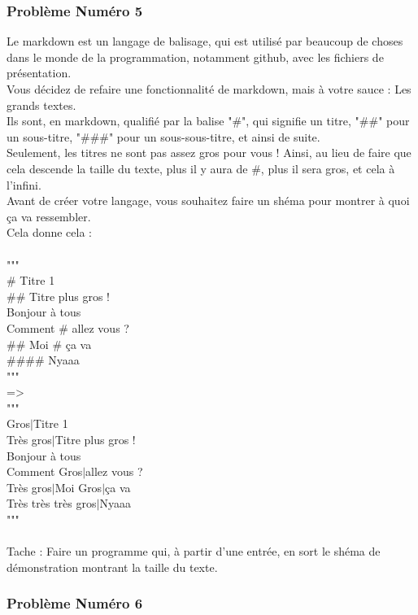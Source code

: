 \documentclass[12pt]{article}
\begin{document}
\subsubsection{Problème Numéro 5}
Le markdown est un langage de balisage, qui est utilisé par beaucoup de choses dans le monde de la programmation, notamment github, avec les fichiers de présentation.\\
Vous décidez de refaire une fonctionnalité de markdown, mais à votre sauce : Les grands textes.\\
Ils sont, en markdown, qualifié par la balise "\#", qui signifie un titre, "\#\#" pour un sous-titre, "\#\#\#" pour un sous-sous-titre, et ainsi de suite.\\
Seulement, les titres ne sont pas assez gros pour vous ! Ainsi, au lieu de faire que cela descende la taille du texte, plus il y aura de \#, plus il sera gros, et cela à l'infini.\\
Avant de créer votre langage, vous souhaitez faire un shéma pour montrer à quoi ça va ressembler.\\
Cela donne cela :
\\\\
"""\\
\# Titre 1\\
\#\# Titre plus gros !\\
Bonjour à tous\\
Comment \# allez vous ?\\
\#\# Moi \# ça va\\
\#\#\#\# Nyaaa\\
"""\\
=\textgreater\\
"""\\
\lbrack Gros$\mid$Titre 1\rbrack\\
\lbrack Très gros$\mid$Titre plus gros !\rbrack\\
Bonjour à tous\\
Comment \lbrack Gros$\mid$allez vous ?\rbrack\\
\lbrack Très gros$\mid$Moi \lbrack Gros$\mid$ça va\rbrack\rbrack\\
\lbrack Très très très gros$\mid$Nyaaa\rbrack\\
"""
\\\\
Tache : Faire un programme qui, à partir d'une entrée, en sort le shéma de démonstration montrant la taille du texte.

\subsubsection{Problème Numéro 6}
\end{document}
